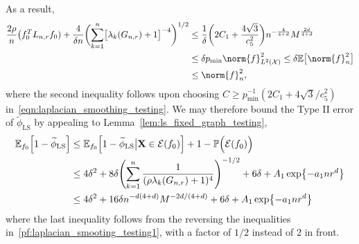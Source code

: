 \documentclass{article}
\newcommand{\1}{\mathbf{1}}
\newcommand{\Lap}{L}
\newcommand{\Xset}{\mathcal{X}}
\newcommand{\Leb}{L}
\newcommand{\mc}[1]{\mathcal{#1}}
\newcommand{\Pbb}{\mathbb{P}}
\newcommand{\Ebb}{\mathbb{E}}
\newcommand{\wt}[1]{\widetilde{#1}}
\newcommand{\LS}{\mathrm{LS}}
\theoremstyle{alden}
\theoremstyle{aldenthm}
\theoremstyle{definition}
\theoremstyle{remark}
\begin{document}
As a result, 
\begin{align*}
\frac{2\rho}{n} \bigl(f_0^T \Lap_{n,r} f_0) + \frac{4}{\delta n}\biggl(\sum_{k = 1}^{n} \bigl[\lambda_k(G_{n,r}) + 1\bigr]^{-4}\biggr)^{1/2} & \leq \frac{1}{\delta}\biggl(2C_1 + \frac{4\sqrt{3}}{c_5^2}\biggr)n^{-\frac{4}{4 + d}} M^{\frac{2d}{4 + d}} \\
& \leq \delta p_{\min} \norm{f}_{\Leb^2(\Xset)}^2 \leq \delta \Ebb\bigl[\norm{f}_n^2\bigr] \\
& \leq \norm{f}_n^2,
\end{align*}
where the second inequality follows upon choosing $C \geq p_{\min}^{-1}(2C_1 + 4\sqrt{3}/c_5^2)$ in~\eqref{eqn:laplacian_smoothing_testing}. We may therefore bound the Type II error of $\wt{\phi}_{\LS}$ by appealing to Lemma~\ref{lem:ls_fixed_graph_testing},
\begin{align*}
\Ebb_{f_0}\Bigl[1 - \wt{\phi}_{\LS}\Bigr] & \leq \Ebb_{f_0}\Bigl[1 - \wt{\phi}_{\LS}\big| \mathbf{X} \in \mc{E}(f_0)\Bigr] + 1 - \Pbb\Bigl(\mc{E}(f_0)\Bigr) \\
& \leq 4 \delta^2 + 8 \delta \Biggl(\sum_{k = 1}^{n} \frac{1}{(\rho\lambda_k(G_{n,r}) + 1)^4} \Biggr)^{-1/2} + 6\delta + A_1\exp\bigl\{-a_1nr^{d}\bigr\} \\
& \leq 4 \delta^2 + 16\delta n^{-d(4 + d)}M^{-2d/(4 + d)}  + 6\delta + A_1\exp\bigl\{-a_1nr^{d}\bigr\}
\end{align*}
where the last inequality follows from the reversing the inequalities in~\eqref{pf:laplacian_smooting_testing1}, with a factor of $1/2$ instead of $2$ in front. 
\end{document}

